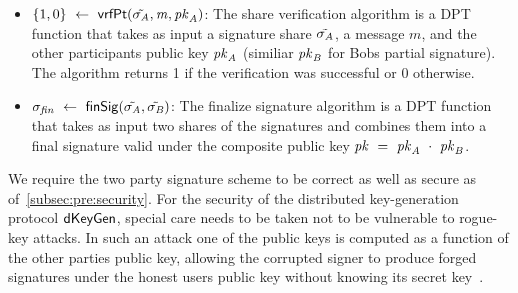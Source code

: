 \begin{definition}
\begin{itemize}
        \item $\{1,0\} ~\leftarrow~ \mathsf{vrfPt}(\tilde{\sigma_{\mathit{A}}}, \mathit{m}, \mathit{pk}_{\mathit{A}})$: The share verification algorithm is a DPT function that takes as input a signature share $\tilde{\sigma_{\mathit{A}}}$, a message $m$, and the other participants public key $\mathit{pk}_{\mathit{A}}$ (similiar $\mathit{pk}_{\mathit{B}}$ for Bobs partial signature).
        The algorithm returns 1 if the verification was successful or 0 otherwise.

        \item $\sigma_{\mathit{fin}} ~\leftarrow~ \mathsf{finSig}(\tilde{\sigma_{\mathit{A}}}, \tilde{\sigma_{\mathit{B}}})$: The finalize signature algorithm is a DPT function that takes as input two shares of the signatures and combines them into a final signature valid under the composite public key $\mathit{pk} ~=~ \mathit{pk}_{\mathit{A}} ~\cdot~ \mathit{pk}_{\mathit{B}}$.

    \end{itemize}

\end{definition}

We require the two party signature scheme to be correct as well as secure as of~\cref{subsec:pre:security}.
For the security of the distributed key-generation protocol $\mathsf{dKeyGen}$, special care needs to be taken not to be vulnerable to rogue-key attacks.
In such an attack one of the public keys is computed as a function of the other parties public key, allowing the corrupted signer to produce forged signatures under the honest users public key without knowing its secret key~\cite{maxwell2019simple}.


